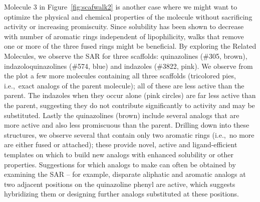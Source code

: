 \documentclass[11pt,letterpaper,biochem]{article}
\newcommand*\fref[1]{Figure~\ref{fig:#1}}
\newcommand*\ie{i.e.,~}
\begin{document}
Molecule 3 in \fref{scafwalk2} is another case where we might want to optimize the physical and chemical properties of the molecule without sacrificing activity or increasing promiscuity. Since solubility has been shown to decrease with number of aromatic rings independent of lipophilicity\cite{Hill2010}, walks that remove one or more of the three fused rings might be beneficial. By exploring the Related Molecules, we observe the SAR for three scaffolds: quinazolines (\#305, brown), indazoloquinazolines (\#574, blue) and indazoles (\#3822, pink). We observe from the plot a few more molecules containing all three scaffolds (tricolored pies, \ie exact analogs of the parent molecule); all of these are less active than the parent. The indazoles when they occur alone (pink circles) are far less active than the parent, suggesting they do not contribute significantly to activity and may be substituted. Lastly the quinazolines (brown) include several analogs that are more active and also less promiscuous than the parent. Drilling down into these structures, we observe several that contain only two aromatic rings (\ie no more are either fused or attached); these provide novel, active and ligand-efficient templates on which to build new analogs with enhanced solubility or other properties. Suggestions for which analogs to make can often be obtained by examining the SAR -- for example, disparate aliphatic and aromatic analogs at two adjacent positions on the quinazoline phenyl are active, which suggests hybridizing them or designing further analogs substituted at these positions.
\end{document}
